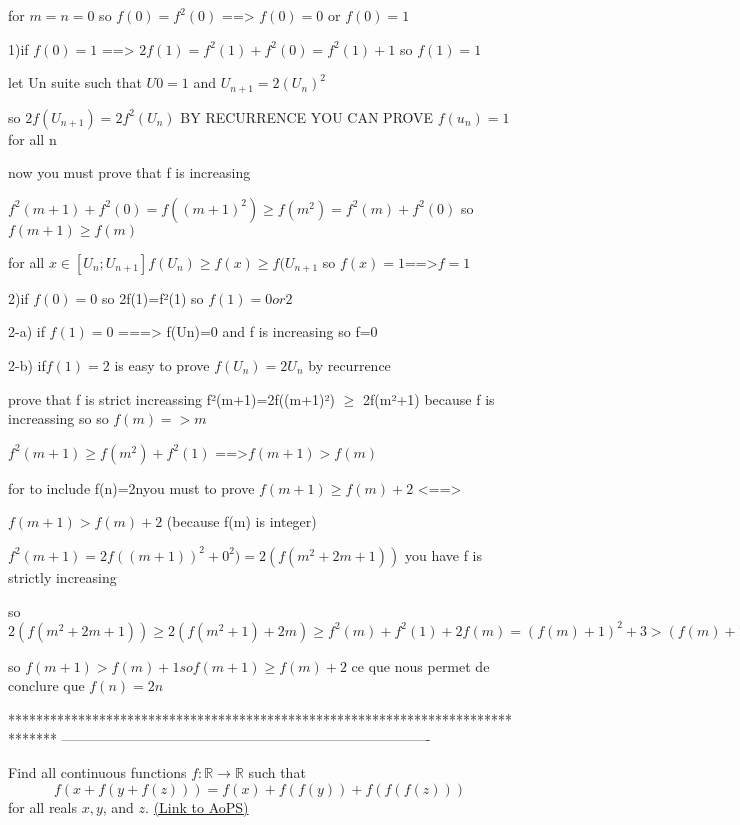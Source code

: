 \begin{solution}
	for $ m = n = 0$  so $ f(0) = f^2(0)$ ==>  $ f(0) = 0$ or $ f(0) = 1$
   
        1)if $ f(0) = 1$  ==> $ 2f(1) = f^2(1) + f^2(0) = f^2(1) + 1$ so $ f(1) = 1$ 

 let Un suite such that $ U0 = 1$  and $ U_{n + 1} = 2(U_n)^2$

so $ 2f(U_{n + 1}) = 2f^2(U_n)$  BY RECURRENCE YOU CAN PROVE $ f(u_n) = 1$ for all n

now you must prove that f is increasing 

$ f^2(m + 1) + f^2(0) = f((m + 1)^2) \geq f(m^2) = f^2(m) + f^2(0)$ so $ f(m + 1) \geq f(m)$

for all $ x \in [U_n;U_{n + 1}] f(U_n)\geq f(x) \geq f(U_{n + 1}$ so $ f(x) = 1$==>$ f = 1$

      2)if $ f(0) = 0$ so 2f(1)=f²(1) so $ f(1) = 0or 2$

   2-a) if $ f(1) = 0$  ===> f(Un)=0 and f is increasing so f=0

   2-b) if$ f(1) = 2$   is easy to prove $ f(U_{n}) = 2U_n$ by recurrence

prove that f is strict increassing f²(m+1)=2f((m+1)²) $ \geq$ 2f(m²+1) because f is increassing so so $ f(m) = > m$

$ f^2(m + 1) \geq f(m^2) + f^2(1)$ ==>$ f(m + 1) > f(m)$
 
for to include f(n)=2nyou must to prove $ f(m + 1) \geq f(m) + 2$     <==>   

$ f(m + 1) > f(m) + 2$ (because f(m) is integer) 


$ f^2(m + 1) = 2f((m + 1))^2 + 0^2) = 2(f(m^2 + 2m + 1))$  you have f is strictly increasing 

so $ 2(f(m^2 + 2m + 1))\geq 2(f(m^2 + 1) + 2m) \geq f^2(m) + f^2(1) + 2f(m) = (f(m) + 1)^2 + 3 > (f(m) + 1)^2$

so $ f(m + 1) > f(m) + 1 so f(m + 1) \geq f(m) + 2$ ce que nous permet de conclure que $ f(n) = 2n$
\end{solution}
*******************************************************************************
-------------------------------------------------------------------------------

\begin{problem}
	Find all continuous functions $ f: \mathbb{R}\rightarrow\mathbb{R}$ such that
\[ f(x+f(y+f(z)))=f(x)+f(f(y))+f(f(f(z)))\]
for all reals $ x,y$, and $z$.
	\flushright \href{https://artofproblemsolving.com/community/c6h214066}{(Link to AoPS)}
\end{problem}



